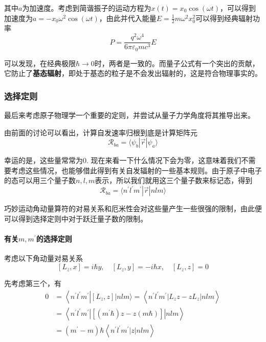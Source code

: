 \documentclass[UTF8]{ctexart}
\begin{document}
\noindent 其中$a$为加速度。考虑到简谐振子的运动方程为$x(t) = x_0 \cos (\omega t)$，可以得到加速度为$a = - x_0 \omega^2 \cos (\omega t)$，由此并代入能量$E = \frac{1}{2} m \omega^2 x_0^2$可以得到经典辐射功率
\begin{equation}
    P = \frac{q^2 \omega^4}{6 \pi \varepsilon_0 m c^3} E
\end{equation}

    可以发现，在经典极限$\hbar \to 0$时，两者是一致的。而量子公式有一个突出的贡献，它防止了\textbf{基态辐射}，即处于基态的粒子是不会发出辐射的，这是符合物理事实的。

    \subsubsection{选择定则}
    最后来考虑原子物理学一个重要的定则，并尝试从量子力学角度将其推导出来。

    由前面的讨论可以看出，计算自发速率归根到底是计算矩阵元
    \begin{equation}
        \mathcal{R}_{ba} = \langle \psi_b | \vec{r} | \psi_a \rangle 
    \end{equation}

\noindent 幸运的是，这些量常常为0. 现在来看一下什么情况下会为零，这意味着我们不需要考虑这些情况，也能够借此得到有关自发辐射的一些基本规则。由于原子中电子的态可以用三个量子数$n,l,m$表示，所以我们就用这三个量子数来标记态，得到
\begin{equation}
    \mathcal{R}_{ba} = \langle n^{\prime} l^{\prime} m^{\prime} | \vec{r} | nlm \rangle 
\end{equation}

\noindent 巧妙运动角动量算符的对易关系和厄米性会对这些量产生一些很强的限制，由此便可以得到选择定则中对于跃迁量子数的限制。

    \paragraph{有关\texorpdfstring{$m,m^{\prime}$}{Lg}的选择定则}
    考虑以下角动量对易关系
    \begin{equation}
        \left[L_{z}, x\right]=i \hbar y, \quad\left[L_{z}, y\right]=-i \hbar x, \quad\left[L_{z}, z\right]=0
    \end{equation}

\noindent 先考虑第三个，有
\begin{equation}
    \begin{aligned}
        0&=\left\langle n^{\prime} l^{\prime} m^{\prime}\right|\left[L_{z}, z\right] |n l m\rangle=\left\langle n^{\prime} l^{\prime} m^{\prime}\left|L_{z} z-z L_{z}\right| n l m\right\rangle \\
        &=\left\langle n^{\prime} l^{\prime} m^{\prime}\left|\left[\left(m^{\prime} \hbar\right) z-z(m \hbar)\right]\right| n l m\right\rangle\\
        &=\left(m^{\prime}-m\right) \hbar\left\langle n^{\prime} l^{\prime} m^{\prime}|z| n l m\right\rangle
        \end{aligned}
\end{equation}
\end{document}
